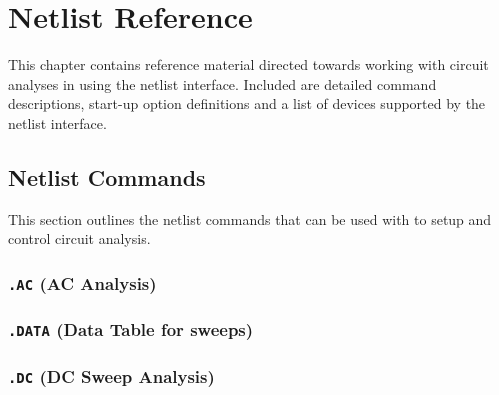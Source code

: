 


\chapter{Netlist Reference}
\label{Netlist_Reference}

{
This chapter contains reference material directed towards working with circuit
analyses in \Xyce{} using the netlist interface.  Included are
detailed command descriptions, start-up option definitions and a list of
devices supported by the \Xyce{} netlist interface.
}

\section{Netlist Commands}
\label{Netlist_Commands}

This section outlines the netlist commands that can be used with \Xyce{} to
setup and control circuit analysis.

\subsection{\texttt{.AC} (AC Analysis) }
 


\newpage
\subsection{\texttt{.DATA} (Data Table for sweeps) }


\newpage
\subsection{\texttt{.DC} (DC Sweep Analysis) }
 


